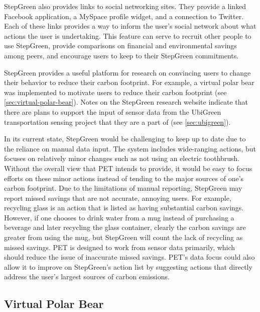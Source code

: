 StepGreen also provides links to social networking sites. They provide a linked Facebook application, a MySpace profile widget, and a connection to Twitter. Each of these links provides a way to inform the user's social network about what actions the user is undertaking. This feature can serve to recruit other people to use StepGreen, provide comparisons on financial and environmental savings among peers, and encourage users to keep to their StepGreen commitments. 

StepGreen provides a useful platform for research on convincing users to change their behavior to reduce their carbon footprint. For example, a virtual polar bear was implemented to motivate users to reduce their carbon footprint (see \autoref{sec:virtual-polar-bear}). Notes on the StepGreen research website \cite{stepgreen-research-website} indicate that there are plans to support the input of sensor data from the UbiGreen transportation sensing project that they are a part of (see \autoref{sec:ubigreen}).

In its current state, StepGreen would be challenging to keep up to date due to the reliance on manual data input. The system includes wide-ranging actions, but focuses on relatively minor changes such as not using an electric toothbrush. Without the overall view that PET intends to provide, it would be easy to focus efforts on these minor actions instead of tending to the major sources of one's carbon footprint. Due to the limitations of manual reporting, StepGreen may report missed savings that are not accurate, annoying users. For example, recycling glass is an action that is listed as having substantial carbon savings. However, if one chooses to drink water from a mug instead of purchasing a beverage and later recycling the glass container, clearly the carbon savings are greater from using the mug, but StepGreen will count the lack of recycling as missed savings. PET is designed to work from sensor data primarily, which should reduce the issue of inaccurate missed savings. PET's data focus could also allow it to improve on StepGreen's action list by suggesting actions that directly address the user's largest sources of carbon emissions.

\subsection{Virtual Polar Bear}
\label{sec:virtual-polar-bear}

